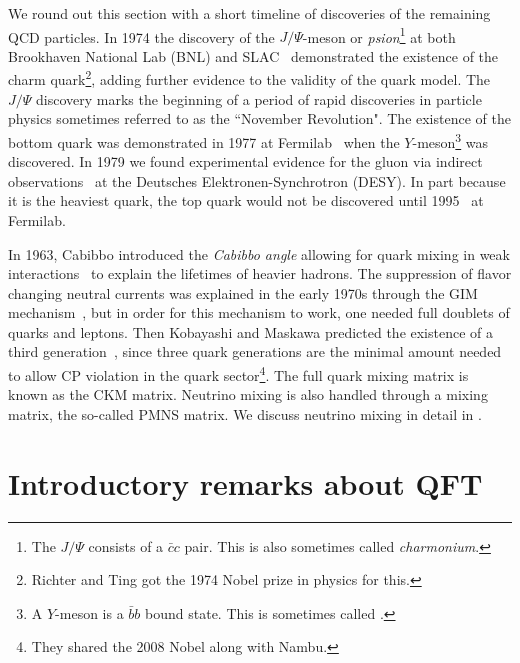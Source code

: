 We round out this section with a short timeline of discoveries of the
remaining QCD particles. In 1974 the discovery of the
$J/\Psi$-meson or {\it psion}\footnote{The $J/\Psi$ consists
of a $\bar{c}c$ pair. This is also sometimes called {\it charmonium}.
} at both Brookhaven National Lab (BNL) and
SLAC~\cite{augustin_discovery_1974,aubert_experimental_1974} demonstrated
the existence of the charm quark\footnote{Richter and Ting got the 1974
Nobel prize in physics for this.}, adding further evidence to
the validity of the quark model. The $J/\Psi$ discovery marks the beginning of a
period of rapid discoveries in particle physics sometimes referred to as the
``November Revolution". The existence of the bottom
quark was demonstrated in 1977 at Fermilab~\cite{herb_observation_1977} when the
$Y$-meson\footnote{A $Y$-meson is a $\bar{b}b$ bound state. This is
sometimes called .} was discovered.
In 1979 we found experimental evidence for the
gluon via indirect observations~\cite{barber_discovery_1979} at the
Deutsches Elektronen-Synchrotron (DESY). In part because it is the
heaviest quark, the top quark would not be discovered until
1995~\cite{abachi_observation_1995,abe_observation_1995}
at Fermilab.




In 1963, Cabibbo introduced the {\it Cabibbo angle} allowing
for quark mixing in weak interactions~\cite{cabibbo_unitary_1963} to
explain the lifetimes of heavier hadrons. The suppression of flavor changing
neutral currents was explained in the early 1970s through the GIM
mechanism~\cite{glashow_weak_1970}, but in order for this mechanism to work,
one needed full doublets of quarks and leptons.
Then Kobayashi and Maskawa predicted the existence of a third
generation~\cite{kobayashi_cp_1973}, since three quark generations are the
minimal amount needed to allow CP violation in the quark sector\footnote{They
shared the 2008 Nobel along with Nambu.}. The full quark mixing matrix
is known as the CKM matrix. Neutrino mixing is also handled
through a mixing matrix, the so-called PMNS matrix. 
We discuss neutrino mixing in detail
in .


\section{Introductory remarks about QFT} 

